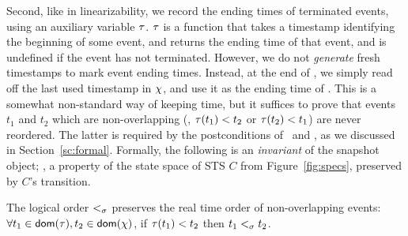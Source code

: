Second, like in linearizability, we record the ending times of
terminated events, using an auxiliary variable $\tau$. $\tau$ is a
function that takes a timestamp identifying the beginning of some
event, and returns the ending time of that event, and is undefined if
the event has not terminated. However, we do not \emph{generate} fresh
timestamps to mark event ending times. Instead, at the end of
\jywrite, we simply read off the last used timestamp in $\chi$, and
use it as the ending time of \jywrite. This is a somewhat non-standard
way of keeping time, but it suffices to prove that events $t_1$ and
$t_2$ which are non-overlapping (\ie, $\tau(t_1) < t_2$ or $\tau(t_2) <
t_1$) are never reordered. The latter is required by the
postconditions of \jywrite\ and \jyscan, as we discussed in
Section~\ref{sc:formal}. 
%
%
%
Formally, the following is an \emph{invariant} of the snapshot object;
\ie, a property of the state space of STS $C$ from
Figure~\ref{fig:specs}, preserved by $C$'s transition.

\begin{invariant}\label{inv:overlap}%
The logical order $\mathrel{<_\sigma}$ preserves the real time order of
non-over\-lap\-ping events: $\forall t_1 \in \mathsf{dom}(\tau), t_2 \in
\mathsf{dom}(\chi)$, if $\tau(t_1) < t_2$ then $t_1 \mathrel{<_\sigma} t_2$.
\end{invariant}

